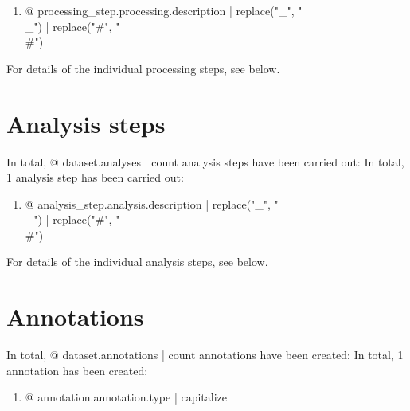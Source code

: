 \begin{enumerate}
\item {@ processing_step.processing.description | replace("_", "\\_") | replace("#", "\\#") }
\end{enumerate}

For details of the individual processing steps, see below.




\section{Analysis steps}

In total, {@ dataset.analyses | count } analysis steps have been carried out:
In total, 1 analysis step has been carried out:

\begin{enumerate}
\item {@ analysis_step.analysis.description | replace("_", "\\_") | replace("#", "\\#") }
\end{enumerate}

For details of the individual analysis steps, see below.




\section{Annotations}

In total, {@ dataset.annotations | count } annotations have been created:
In total, 1 annotation has been created:

\begin{enumerate}
\item {@ annotation.annotation.type | capitalize }
\end{enumerate}

